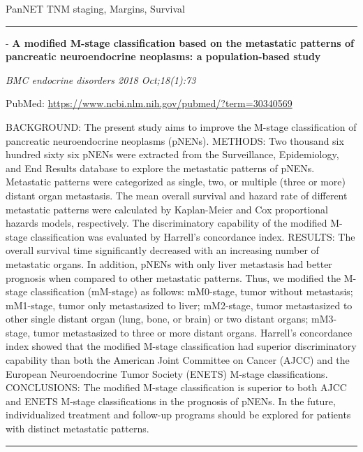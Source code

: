 \documentclass[]{article}
\begin{document}
PanNET TNM staging, Margins, Survival

\begin{center}\rule{0.5\linewidth}{\linethickness}\end{center}

 - \textbf{A modified M-stage classification based on the metastatic
patterns of pancreatic neuroendocrine neoplasms: a population-based
study}

\emph{BMC endocrine disorders 2018 Oct;18(1):73}

PubMed: \url{https://www.ncbi.nlm.nih.gov/pubmed/?term=30340569}

BACKGROUND: The present study aims to improve the M-stage classification
of pancreatic neuroendocrine neoplasms (pNENs). METHODS: Two thousand
six hundred sixty six pNENs were extracted from the Surveillance,
Epidemiology, and End Results database to explore the metastatic
patterns of pNENs. Metastatic patterns were categorized as single, two,
or multiple (three or more) distant organ metastasis. The mean overall
survival and hazard rate of different metastatic patterns were
calculated by Kaplan-Meier and Cox proportional hazards models,
respectively. The discriminatory capability of the modified M-stage
classification was evaluated by Harrell's concordance index. RESULTS:
The overall survival time significantly decreased with an increasing
number of metastatic organs. In addition, pNENs with only liver
metastasis had better prognosis when compared to other metastatic
patterns. Thus, we modified the M-stage classification (mM-stage) as
follows: mM0-stage, tumor without metastasis; mM1-stage, tumor only
metastasized to liver; mM2-stage, tumor metastasized to other single
distant organ (lung, bone, or brain) or two distant organs; mM3-stage,
tumor metastasized to three or more distant organs. Harrell's
concordance index showed that the modified M-stage classification had
superior discriminatory capability than both the American Joint
Committee on Cancer (AJCC) and the European Neuroendocrine Tumor Society
(ENETS) M-stage classifications. CONCLUSIONS: The modified M-stage
classification is superior to both AJCC and ENETS M-stage
classifications in the prognosis of pNENs. In the future, individualized
treatment and follow-up programs should be explored for patients with
distinct metastatic patterns.

{}

{}

\begin{center}\rule{0.5\linewidth}{\linethickness}\end{center}
\end{document}
